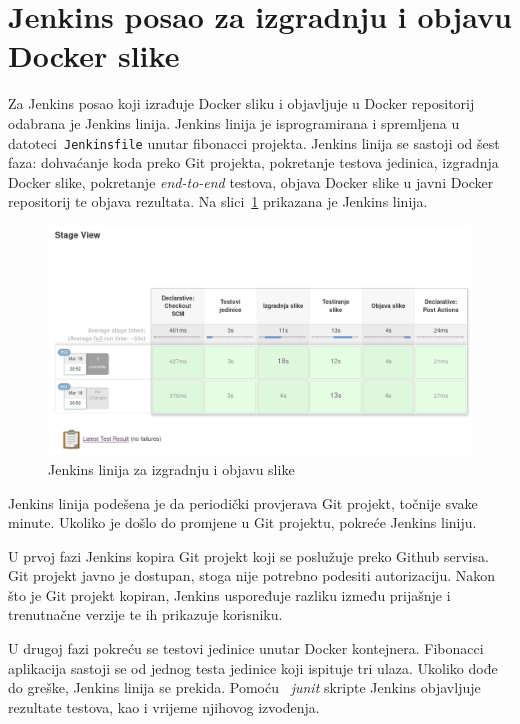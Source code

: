 \section{Jenkins posao za izgradnju i objavu Docker slike}
Za Jenkins posao koji izrađuje Docker sliku i objavljuje u Docker repositorij odabrana je Jenkins
linija. Jenkins linija je isprogramirana i spremljena u datoteci~\texttt{Jenkinsfile} unutar
fibonacci projekta. Jenkins linija se sastoji od šest faza: dohvaćanje koda preko Git projekta,
pokretanje testova jedinica, izgradnja Docker slike, pokretanje \textit{end-to-end} testova,
objava Docker slike u javni Docker repositorij te objava rezultata. Na
slici~\ref{fig:03jenkins_pipeline} prikazana je Jenkins linija.

\begin{figure}[h]
    \centering
    \includegraphics[width=\textwidth]{img/03/jenkins_pipeline.png}
    \caption{Jenkins linija za izgradnju i objavu slike}%
    \label{fig:03jenkins_pipeline}
\end{figure}

Jenkins linija podešena je da periodički provjerava Git projekt, točnije svake minute. Ukoliko je
došlo do promjene u Git projektu, pokreće Jenkins liniju.

U prvoj fazi Jenkins kopira Git projekt koji se poslužuje preko Github servisa. Git projekt javno je
dostupan, stoga nije potrebno podesiti autorizaciju. Nakon što je Git projekt kopiran, Jenkins
uspoređuje razliku između prijašnje i trenutnačne verzije te ih prikazuje korisniku.

U drugoj fazi pokreću se testovi jedinice unutar Docker kontejnera. Fibonacci aplikacija sastoji se
od jednog testa jedinice koji ispituje tri ulaza. Ukoliko dođe do greške, Jenkins linija se prekida.
Pomoću ~\textit{junit} skripte Jenkins objavljuje rezultate testova, kao i vrijeme njihovog
izvođenja.

